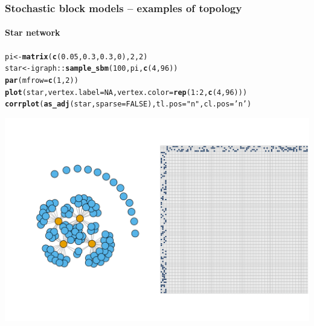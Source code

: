 \documentclass{beamer}\usepackage[]{graphicx}\usepackage[]{color}
\makeatletter
\newcommand{\hlnum}[1]{\textcolor[rgb]{0.686,0.059,0.569}{#1}}%
\newcommand{\hlstr}[1]{\textcolor[rgb]{0.192,0.494,0.8}{#1}}%
\newcommand{\hlopt}[1]{\textcolor[rgb]{0,0,0}{#1}}%
\newcommand{\hlstd}[1]{\textcolor[rgb]{0.345,0.345,0.345}{#1}}%
\newcommand{\hlkwb}[1]{\textcolor[rgb]{0.69,0.353,0.396}{#1}}%
\newcommand{\hlkwc}[1]{\textcolor[rgb]{0.333,0.667,0.333}{#1}}%
\newcommand{\hlkwd}[1]{\textcolor[rgb]{0.737,0.353,0.396}{\textbf{#1}}}%
\newenvironment{kframe}{%
 \def\at@end@of@kframe{}%
 \ifinner\ifhmode%
  \def\at@end@of@kframe{\end{minipage}}%
  \begin{minipage}{\columnwidth}%
 \fi\fi%
 \def\FrameCommand##1{\hskip\@totalleftmargin \hskip-\fboxsep
 \colorbox{shadecolor}{##1}\hskip-\fboxsep
     \hskip-\linewidth \hskip-\@totalleftmargin \hskip\columnwidth}%
 \MakeFramed {\advance\hsize-\width
   \@totalleftmargin\z@ \linewidth\hsize
   \@setminipage}}%
 {\par\unskip\endMakeFramed%
 \at@end@of@kframe}
\newenvironment{knitrout}{}{} %
\makeatother
\begin{document}
\begin{frame}[fragile]
  \frametitle{Stochastic block models -- examples of topology}
  \framesubtitle{Star network}

\begin{knitrout}\scriptsize
{}\color{fgcolor}\begin{kframe}
\begin{alltt}
\hlstd{pi} \hlkwb{<-} \hlkwd{matrix}\hlstd{(}\hlkwd{c}\hlstd{(}\hlnum{0.05}\hlstd{,}\hlnum{0.3}\hlstd{,}\hlnum{0.3}\hlstd{,}\hlnum{0}\hlstd{),}\hlnum{2}\hlstd{,}\hlnum{2}\hlstd{)}
\hlstd{star} \hlkwb{<-} \hlstd{igraph}\hlopt{::}\hlkwd{sample_sbm}\hlstd{(}\hlnum{100}\hlstd{, pi,} \hlkwd{c}\hlstd{(}\hlnum{4}\hlstd{,} \hlnum{96}\hlstd{))}
\hlkwd{par}\hlstd{(}\hlkwc{mfrow} \hlstd{=} \hlkwd{c}\hlstd{(}\hlnum{1}\hlstd{,}\hlnum{2}\hlstd{))}
\hlkwd{plot}\hlstd{(star,} \hlkwc{vertex.label}\hlstd{=}\hlnum{NA}\hlstd{,} \hlkwc{vertex.color} \hlstd{=} \hlkwd{rep}\hlstd{(}\hlnum{1}\hlopt{:}\hlnum{2}\hlstd{,}\hlkwd{c}\hlstd{(}\hlnum{4}\hlstd{,}\hlnum{96}\hlstd{)))}
\hlkwd{corrplot}\hlstd{(}\hlkwd{as_adj}\hlstd{(star,} \hlkwc{sparse} \hlstd{=}\hlnum{FALSE}\hlstd{),} \hlkwc{tl.pos} \hlstd{=} \hlstr{"n"}\hlstd{,} \hlkwc{cl.pos} \hlstd{=} \hlstr{'n'}\hlstd{)}
\end{alltt}
\end{kframe}
\includegraphics[width=.8\textwidth]{figures/unnamed-chunk-9-1} 
\end{knitrout}

\end{frame}
\end{document}
